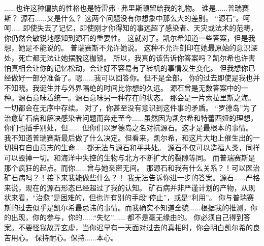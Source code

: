 \documentclass[openany]{book}
\begin{document}
\begin{dialogue}
     ......也许这种偏执的性格也是特雷弗·弗里斯顿留给我的礼物。
     谁是......普瑞赛斯？
     源石......又是什么？
     这两个问题没有你想象中那么大的差别。
     “源石”。呵呵......即使失去了记忆，即使刚才你得知的事远超了感染者、天灾或法术的范畴，你仍然会敏锐地感知到源石的重要性。
     这就对了。凯尔希知道一些答案，但是我想，她是不能说的。
     普瑞赛斯不允许她说。
     这种不允许刻印在她最原始的意识深处，死亡都无法让她摆脱这枷锁。
     所以，我真的该告诉你答案吗？凯尔希也许害怕真相会让你的记忆松动，会让好不容易有了转机的事情发生变化。
     但我想你已经做好一部分准备了。嗯......我可以回答你。但不是全部。
     你的过去即使是我也并不知晓。我诞生并与外界隔绝的时间比你想的久远。
     源石曾是无数答案中的一种。源石意味着统一。源石意味另一种存在的状态。
     那会是一片索拉里斯之海。一切都会在无序中存续。
     对了，你甚至没有意识到这件事的矛盾。
     “罗德岛”为了治愈矿石病和解决感染者问题而奔走至今......虽然因为凯尔希和特蕾西娅的理想，你们也插手别处，但......
     但你们以罗德岛之名对抗源石。这才是最根本的事情。
     我不知道普瑞赛斯最后做了什么决定。但看来，凯尔希，和这片大地上催生出的一切拥有自由意志的生命......都无法与源石和平共处。
     源石不仅可以造福人类，同样可以毁掉一切。和海洋中失控的生物与北方不断扩大的裂隙等同。
     而普瑞赛斯是那个疯狂的起点。而你......曾与她亲密无间。
     那源石和我有什么关系？！可以医治矿石病吗？！接下来我能做些什么？！
     我无法告诉你进一步的答案。源石......严格来说，现在的源石形态已经超过了我的认知。
     矿石病并非严谨计划的产物，从现状来看，“治愈”是困难的，但也许有别的手段“停止”，或是“利用”。
     你与普瑞赛斯的过去似乎是凯尔希最忌讳的事情。而我确实不知道全貌......根据我的推测，你的出现，你的参与，你的......“失忆”......
     都不是毫无缘由的。
     你必须自己得到答案。不要怪我故弄玄虚，当你迟早有一天面对过去的真相时，你会明白凯尔希的良苦用心。
     保持耐心。保持......本心。
\end{dialogue}
\end{document}
